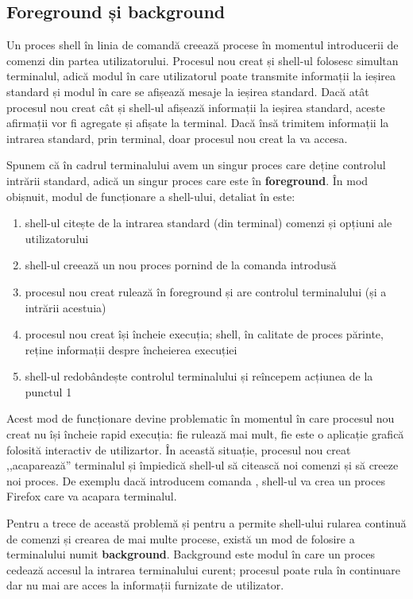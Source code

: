 \subsection{Foreground și background}
\label{sec:procese-ierarhie-foreground-background}

Un proces shell în linia de comandă creează procese în momentul introducerii de
comenzi din partea utilizatorului. Procesul nou creat și shell-ul folosesc
simultan terminalul, adică modul în care utilizatorul poate transmite informații
la ieșirea standard și modul în care se afișează mesaje la ieșirea standard.
Dacă atât procesul nou creat cât și shell-ul afișează informații la ieșirea
standard, aceste afirmații vor fi agregate și afișate la terminal. Dacă însă
trimitem informații la intrarea standard, prin terminal, doar procesul nou creat
la va accesa.

Spunem că în cadrul terminalului avem un singur proces care deține controlul
intrării standard, adică un singur proces care este în \textbf{foreground}. În
mod obișnuit, modul de funcționare a shell-ului, detaliat în  este:

\begin{enumerate}
	\item shell-ul citește de la intrarea standard (din terminal) comenzi și
		opțiuni ale utilizatorului
	\item shell-ul creează un nou proces pornind de la comanda introdusă
	\item procesul nou creat rulează în foreground și are controlul
		terminalului (și a intrării acestuia)
	\item procesul nou creat își încheie execuția; shell, în calitate de
		proces părinte, reține informații despre încheierea execuției
	\item shell-ul redobândește controlul terminalului și reîncepem acțiunea
		de la punctul 1
\end{enumerate}

Acest mod de funcționare devine problematic în momentul în care procesul nou
creat nu își încheie rapid execuția: fie rulează mai mult, fie este o aplicație
grafică folosită interactiv de utilizartor. În această situație, procesul nou
creat ,,acaparează'' terminalul și împiedică shell-ul să citească noi comenzi și
să creeze noi proces. De exemplu dacă introducem comanda , shell-ul va
crea un proces Firefox care va acapara terminalul.

Pentru a trece de această problemă și pentru a permite shell-ului rularea
continuă de comenzi și crearea de mai multe procese, există un mod de folosire a
terminalului numit \textbf{background}. Background este modul în care un proces
cedează accesul la intrarea terminalului curent; procesul poate rula în
continuare dar nu mai are acces la informații furnizate de utilizator.

